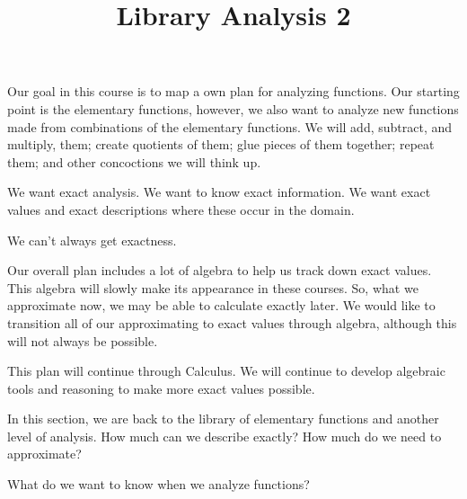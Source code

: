 \documentclass{ximera}
\title{Library Analysis 2}
\begin{document}
\begin{abstract}
\end{abstract}
\maketitle


Our goal in this course is to map a own plan for analyzing functions.  Our starting point is the elementary functions, however, we also want to analyze new functions made from combinations of the elementary functions.  We will add, subtract, and multiply, them; create quotients of them; glue pieces of them together; repeat them; and other concoctions we will think up.

We want exact analysis.  We want to know exact information.  We want exact values and exact descriptions where these occur in the domain.

We can't always get exactness. 

Our overall plan includes a lot of algebra to help us track down exact values.  This algebra will slowly make its appearance in these courses.  So, what we approximate now, we may be able to calculate exactly later.  We would like to transition all of our approximating to exact values through algebra, although this will not always be possible.

This plan will continue through Calculus.  We will continue to develop algebraic tools and reasoning to make more exact values possible.

In this section, we are back to the library of elementary functions and another level of analysis.  How much can we describe exactly? How much do we need to approximate?



What do we want to know when we analyze functions?
\end{document}
